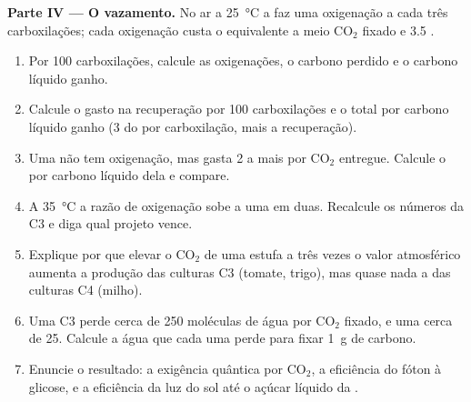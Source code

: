 \begin{problem}
\medskip
\noindent\textbf{Parte IV --- O vazamento.}
No ar a \qty{25}{\celsius} a  faz uma oxigenação a cada três
carboxilações; cada oxigenação custa o equivalente a meio
$\mathrm{CO_2}$ fixado e 3.5 .
\begin{enumerate}[resume]
  \item Por 100 carboxilações, calcule as oxigenações, o carbono
        perdido e o carbono líquido ganho.
  \item Calcule o  gasto na recuperação por 100 carboxilações e o
         total por carbono líquido ganho (3  do 
        por carboxilação, mais a recuperação).
  \item Uma  não tem oxigenação, mas gasta 2  a mais por
        $\mathrm{CO_2}$ entregue. Calcule o  por carbono líquido dela
        e compare.
  \item A \qty{35}{\celsius} a razão de oxigenação sobe a uma em duas.
        Recalcule os números da C3 e diga qual projeto vence.
  \item Explique por que elevar o $\mathrm{CO_2}$ de uma estufa a três
        vezes o valor atmosférico aumenta a produção das culturas C3
        (tomate, trigo), mas quase nada a das culturas C4 (milho).
  \item Uma  C3 perde cerca de 250 moléculas de água por
        $\mathrm{CO_2}$ fixado, e uma  cerca de 25. Calcule a
        água que cada uma perde para fixar \qty{1}{g} de carbono.
  \item Enuncie o resultado: a exigência quântica por $\mathrm{CO_2}$, a
        eficiência do fóton à glicose, e a eficiência da luz do sol até
        o açúcar líquido da .
\end{enumerate}
\end{problem}
